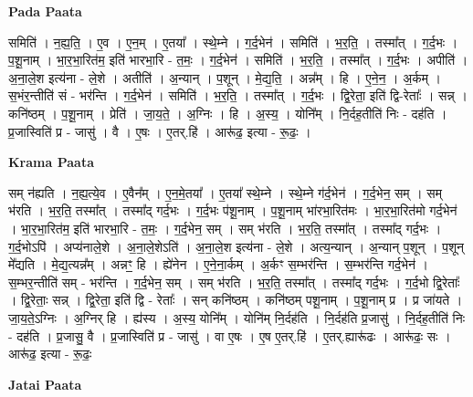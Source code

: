 \documentclass[17pt]{extarticle}
\begin{document}
\textbf{Pada Paata} \newline

समिति॑ । न॒ह्य॒ति॒ । ए॒व । ए॒न॒म् । ए॒तया᳚ । स्थे॒म्ने । ग॒र्द॒भेन॑ । समिति॑ । भ॒र॒ति॒ । तस्मा᳚त् । ग॒र्द॒भः । प॒शू॒नाम् । भा॒र॒भा॒रित॑म॒ इति॑ भारभा॒रि - त॒मः॒ । ग॒र्द॒भेन॑ । समिति॑ । भ॒र॒ति॒ । तस्मा᳚त् । ग॒र्द॒भः । अपीति॑ । अ॒ना॒ले॒श इत्य॑ना - ले॒शे । अतीति॑ । अ॒न्यान् । प॒शून् । मे॒द्य॒ति॒ । अन्न᳚म् । हि । ए॒ने॒न॒ । अ॒र्कम् । स॒भंर॒न्तीति॑ सं - भर॑न्ति । ग॒र्द॒भेन॑ । समिति॑ । भ॒र॒ति॒ । तस्मा᳚त् । ग॒र्द॒भः । द्वि॒रेता॒ इति॑ द्वि-रेताः᳚ । सन्न् । कनि॑ष्ठम् । प॒शू॒नाम् । प्रेति॑ । जा॒य॒ते॒ । अ॒ग्निः । हि । अ॒स्य॒ । योनि᳚म् । नि॒र्दह॒तीति॑ निः - दह॑ति । प्र॒जास्विति॑ प्र - जासु॑ । वै । ए॒षः । ए॒तर्.हि॑ । आरू॑ढ॒ इत्या - रू॒ढः॒ ।  \newline


\textbf{Krama Paata} \newline

सम् न॑ह्यति । न॒ह्य॒त्ये॒व । ए॒वैन᳚म् । ए॒न॒मे॒तया᳚ । ए॒तया᳚ स्थे॒म्ने । स्थे॒म्ने ग॑र्द॒भेन॑ । ग॒र्द॒भेन॒ सम् । सम् भ॑रति । भ॒र॒ति॒ तस्मा᳚त् । तस्मा᳚द् गर्द॒भः । ग॒र्द॒भः प॑शू॒नाम् । प॒शू॒नाम् भा॑रभा॒रित॑मः । भा॒र॒भा॒रित॑मो गर्द॒भेन॑ । भा॒र॒भा॒रित॑म॒ इति॑ भारभा॒रि - त॒मः॒ । ग॒र्द॒भेन॒ सम् । सम् भ॑रति । भ॒र॒ति॒ तस्मा᳚त् । तस्मा᳚द् गर्द॒भः । ग॒र्द॒भोऽपि॑ । अप्य॑नाले॒शे । अ॒ना॒ले॒शेऽति॑ । अ॒ना॒ले॒श इत्य॑ना - ले॒शे । अत्य॒न्यान् । अ॒न्यान् प॒शून् । प॒शून् मे᳚द्यति । मे॒द्य॒त्यन्न᳚म् । अन्नꣳ॒॒ हि । ह्ये॑नेन । ए॒ने॒ना॒र्कम् । अ॒र्कꣳ स॒म्भर॑न्ति । स॒म्भर॑न्ति गर्द॒भेन॑ । स॒म्भर॒न्तीति॑ सम् - भर॑न्ति । ग॒र्द॒भेन॒ सम् । सम् भ॑रति । भ॒र॒ति॒ तस्मा᳚त् । तस्मा᳚द् गर्द॒भः । ग॒र्द॒भो द्वि॒रेताः᳚ । द्वि॒रेताः॒ सन्न् । द्वि॒रेता॒ इति॑ द्वि - रेताः᳚ । सन् कनि॑ष्ठम् । कनि॑ष्ठम् पशू॒नाम् । प॒शू॒नाम् प्र । प्र जा॑यते । जा॒य॒ते॒ऽग्निः । अ॒ग्निर् हि । ह्य॑स्य । अ॒स्य॒ योनि᳚म् । योनि॑म् नि॒र्दह॑ति । नि॒र्दह॑ति प्र॒जासु॑ । नि॒र्दह॒तीति॑ निः - दह॑ति । प्र॒जासु॒ वै । प्र॒जास्विति॑ प्र - जासु॑ । वा ए॒षः । ए॒ष ए॒तर्.हि॑ । ए॒तर्.ह्यारू॑ढः । आरू॑ढः॒ सः । आरू॑ढ॒ इत्या - रू॒ढः॒ \newline

\textbf{Jatai Paata} \newline
\end{document}
